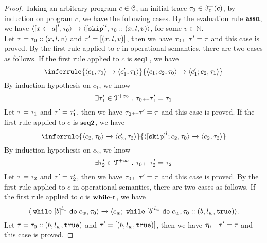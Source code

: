 \begin{proof}
  Taking an arbitrary program $c \in \mathcal{C}$, an initial trace $\mathtt{\tau}_0 \in \mathcal{T}^{+}_0(c)$, by induction on program $c$, we have the following cases.
  By the evaluation rule $\textbf{\small{assn}}$, we have
  $
  {
  \config{\clabel{\assign{{x}}{\aexpr}}^{l},  \trace_0 } 
  \xrightarrow{} 
  \config{\clabel{\eskip}^{l}, \trace_0 :: ({x}, l, v)}
  }$, for some $v \in \mathbb{N}$.
  \\
  Let $\mathtt{\tau} = \mathtt{\tau}_0 ::({x}, l, v)$ and $\mathtt{\tau}' =  [({x}, l, v) ]$,
  then we have $\mathtt{\tau}_0 {\scriptscriptstyle ++} \mathtt{\tau}' = \mathtt{\tau}$ and this case is proved.
  By the first rule applied to $c$ in operational semantics, there are two cases as follows.
  If the first rule applied to $c$ is $\textbf{\small{seq1}}$, we have
  \[
    \inferrule
    {
    \config{{c_1, \trace_0}}
    \xrightarrow{}
    \config{{c_1',  \trace_1}}
    }
    {
    \config{{c_1; c_2, \trace_0}} 
    \xrightarrow{} 
    \config{{c_1'; c_2, \trace_1}}
    }
  \]
  By induction hypothesis on $c_1$, we know 
  \[
    \exists \mathtt{\tau}_1' \in \mathcal{T}^{+\infty} ~.~ \mathtt{\tau}_0 {\scriptscriptstyle ++} \mathtt{\tau}_1' = \mathtt{\tau}_1
  \]
  Let $\mathtt{\tau} = \mathtt{\tau}_1$ and $\mathtt{\tau}' =  \mathtt{\tau}_1'$,
  then we have $\mathtt{\tau}_0 {\scriptscriptstyle ++} \mathtt{\tau}' = \mathtt{\tau}$ and this case is proved.
  If the first rule applied to $c$ is $\textbf{\small{seq2}}$, we have
  \[
    \inferrule
    {
    \config{{c_2, \trace_0}}
    \xrightarrow{}
    \config{{c_2',  \trace_2}}
    }
    {
    \config{{\clabel{\eskip}^l; c_2, \trace_0}} 
    \xrightarrow{} 
    \config{{c_2, \trace_2}}
    }
  \]
  By induction hypothesis on $c_2$, we know 
  \[
    \exists \mathtt{\tau}_2' \in \mathcal{T}^{+\infty} ~.~ \mathtt{\tau}_0 {\scriptscriptstyle ++} \mathtt{\tau}_2' = \mathtt{\tau}_2
  \]
  Let $\mathtt{\tau} = \mathtt{\tau}_2$ and $\mathtt{\tau}' =  \mathtt{\tau}_2'$,
  then we have $\mathtt{\tau}_0 {\scriptscriptstyle ++} \mathtt{\tau}' = \mathtt{\tau}$ and this case is proved.
  By the first rule applied to $c$ in operational semantics, there are two cases as follows.
  If the first rule applied to $c$ is $\textbf{\small{while-t}}$, we have
  \[
    \config{{\ewhile \clabel{b}^{l_w} \edo c_w, \trace_0}}
    \xrightarrow{} 
    \config{{
    c_w; \ewhile \clabel{b}^{l_w} \edo c_w,
    \trace_0 :: (b, l_w, \etrue)}}.
  \]
  Let $\mathtt{\tau} = \mathtt{\tau}_0 ::(b, l_w, \mathtt{true})$ and $\mathtt{\tau}' =  [(b, l_w, \mathtt{true})]$,
  then we have $\mathtt{\tau}_0 {\scriptscriptstyle ++} \mathtt{\tau}' = \mathtt{\tau}$ and this case is proved.

\end{proof}
